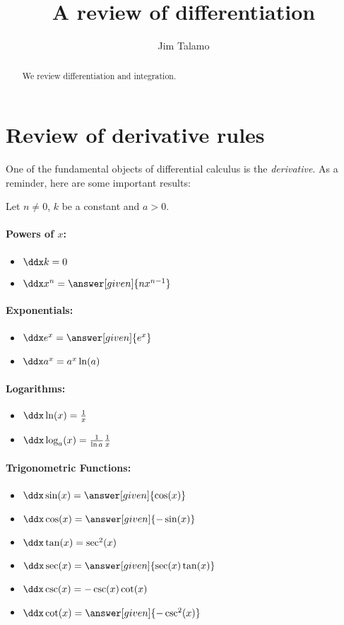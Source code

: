 \documentclass[nooutcomes]{ximera}
\author{Jim Talamo}
\title[Dig-In:]{A review of differentiation}
\begin{document}
\begin{abstract}
  We review differentiation and integration.
\end{abstract}
\maketitle


\section{Review of derivative rules}

One of the fundamental objects of differential calculus is the \emph{derivative}.  As a reminder, here are some important results:


\begin{theorem}
Let $n\ne 0$, $k$ be a constant and $a>0$.


\paragraph{Powers of $x$:}
\begin{itemize}
\item $\ddx k =0$
\item $\ddx x^n  = \answer[given]{n x^{n-1}}$
\end{itemize}

\paragraph{Exponentials:}
\begin{itemize}
\item $\ddx e^x = \answer[given]{e^x}$
\item $\ddx a^x = a^x\ln(a)$
\end{itemize}

\paragraph{Logarithms:}
\begin{itemize}
\item $\ddx \ln(x) = \frac{1}{x}$
\item $\ddx \log_a (x) = \frac{1}{\ln a} \frac{1}{x}$
\end{itemize}

\paragraph{Trigonometric Functions:}
\begin{itemize}
\item $\ddx \sin(x) = \answer[given]{\cos(x)}$
\item $\ddx \cos(x) = \answer[given]{-\sin(x)}$  
\item $\ddx \tan(x) = \sec^2(x)$  
\item $\ddx \sec(x) = \answer[given]{\sec(x)\tan(x)}$ 
\item $\ddx \csc(x) = -\csc(x)\cot(x)$
\item $\ddx \cot(x) = \answer[given]{-\csc^2(x)}$
\end{itemize}


\end{theorem}
\end{document}
